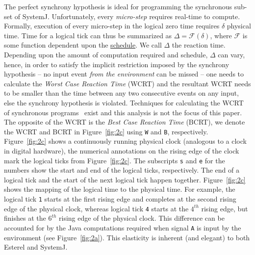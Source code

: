 The perfect synchrony hypothesis is ideal for programming the
synchronous sub-set of SystemJ. Unfortunately, every \textit{micro-step}
requires real-time to compute. Formally, execution of every micro-step
in the logical zero time requires $\delta$ physical time. Time for a
logical tick can thus be summarized as $\Delta = \mathcal{F} (\delta)$,
where $\mathcal{F}$ is some function dependent upon the
\underline{schedule}. We call $\Delta$ the reaction time. Depending upon
the amount of computation required and schedule, $\Delta$ can vary,
hence, in order to satisfy the implicit restriction imposed by the
synchrony hypothesis -- no input event \textit{from the environment} can
be missed -- one needs to calculate the \textit{Worst Case Reaction
  Time} (WCRT) and the resultant WCRT needs to be smaller than the time
between any two consecutive events on any input, else the synchrony
hypothesis is violated. Techniques for calculating the WCRT of
synchronous programs~\cite{boldt07} exist and this analysis is not the
focus of this paper. The opposite of the WCRT is the \textit{Best Case
  Reaction Time} (BCRT), we denote the WCRT and BCRT in
Figure~\ref{fig:2c} using \texttt{W} and \texttt{B},
respectively. Figure~\ref{fig:2c} shows a continuously running physical
clock (analogous to a clock in digital hardware), the numerical
annotations on the rising edge of the clock mark the logical ticks from
Figure~\ref{fig:2c}. The subscripts \texttt{s} and \texttt{e} for the
numbers show the start and end of the logical ticks, respectively. The
end of a logical tick and the start of the next logical tick happen
together. Figure~\ref{fig:2c} shows the mapping of the logical time to
the physical time. For example, the logical tick \texttt{1} starts at
the first rising edge and completes at the second rising edge of the
physical clock, whereas logical tick \texttt{4} starts at the $4^{th}$
rising edge, but finishes at the $6^{th}$ rising edge of the physical
clock. This difference can be accounted for by the Java computations
required when signal \texttt{A} is input by the environment (see
Figure~\ref{fig:2a}). This elasticity is inherent (and elegant) to both
Esterel and SystemJ.



